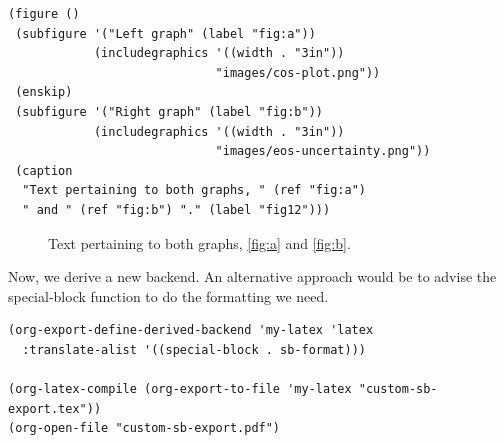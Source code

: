 \documentclass[11pt]{article}
\begin{document}
\begin{verbatim}
(figure ()
 (subfigure '("Left graph" (label "fig:a"))
            (includegraphics '((width . "3in"))
                             "images/cos-plot.png"))
 (enskip)
 (subfigure '("Right graph" (label "fig:b"))
            (includegraphics '((width . "3in"))
                             "images/eos-uncertainty.png"))
 (caption
  "Text pertaining to both graphs, " (ref "fig:a")
  " and " (ref "fig:b") "." (label "fig12")))
\end{verbatim}

\begin{figure}
\enskip
{}
\caption{Text pertaining to both graphs, \ref{fig:a} and \ref{fig:b}.\label{fig12}}
\end{figure}


Now, we derive a new backend. An alternative approach would be to advise the special-block function to do the formatting we need.
\begin{verbatim}
(org-export-define-derived-backend 'my-latex 'latex
  :translate-alist '((special-block . sb-format)))

(org-latex-compile (org-export-to-file 'my-latex "custom-sb-export.tex"))
(org-open-file "custom-sb-export.pdf")
\end{verbatim}
\end{document}

